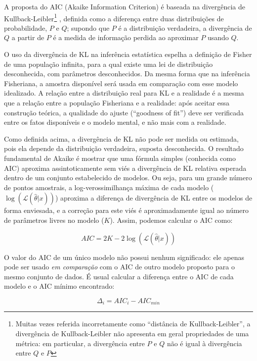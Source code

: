 A proposta do AIC (Akaike Information Criterion)
é baseada na divergência de Kullback-Leibler\footnote{Muitas vezes referida incorretamente
como ``distância de Kullback-Leibler'', a divergência de Kullback-Leibler não apresenta em geral propriedades
de uma métrica: em particular, a divergência entre $P$ e $Q$ não é igual à divergência entre $Q$ e $P$} 
\citep{Kullback51}, definida
como a diferença entre duas distribuições de probabilidade, $P$ e $Q$; supondo que $P$ é a distribuição verdadeira,
a divergência de $Q$ a partir de $P$ é a medida de informação perdida ao aproximar $P$ usando $Q$.

O uso da divergência de KL na inferência estatística espelha a definição de Fisher de uma população infinita, 
para a qual existe uma lei de distribuição desconhecida, com parâmetros desconhecidos. Da mesma forma que
na inferência Fisheriana, a amostra disponível será usada em comparação com esse modelo idealizado. A relação entre
a distribuição real para KL e a realidade é a mesma que a relação entre a população Fisheriana e a realidade: 
após aceitar essa construção teórica, a qualidade do ajuste (``goodness of fit'') deve ser verificada entre
os fatos disponíveis e o modelo mental, e não mais com a realidade. 

Como definida acima, a divergência de KL não pode ser medida ou estimada, pois ela depende da distribuição
verdadeira, suposta desconhecida. O resultado fundamental de Akaike é mostrar que uma fórmula simples
(conhecida como AIC)
aproxima assintoticamente sem viés a divergência de KL relativa esperada dentro de um conjunto estabelecido
de modelos. Ou seja, para um grande número de pontos amostrais, a log-verossimilhança máxima de cada modelo
($\log(\mathcal{L}(\hat\theta|x))$)
aproxima a diferença de divergência de KL entre os modelos de forma enviesada, e a correção para este viés
é aproximadamente igual ao número de parâmetros livres no modelo ($K$)\citep{Burnham04}. 
Assim, podemos calcular o AIC como:

\begin{equation}
AIC = 2K - 2\log(\mathcal{L}(\hat\theta|x))
\end{equation}

O valor do AIC de um único modelo não possui nenhum significado: ele apenas pode ser usado {\em em comparação}
com o AIC de outro modelo proposto para o mesmo conjunto de dados. É usual calcular a diferença entre o AIC de cada
modelo e o AIC mínimo encontrado:

\begin{equation}
\Delta_i = AIC_i - AIC_{min}
\end{equation}

